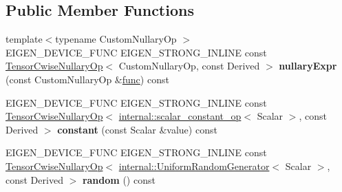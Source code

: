 \subsection*{Public Member Functions}
\begin{DoxyCompactItemize}
\item 
\mbox{\label{class_eigen_1_1_tensor_base_3_01_derived_00_01_read_only_accessors_01_4_a0205b14457f9eb4575b3f0562fc80ca5}} 
{\footnotesize template$<$typename Custom\+Nullary\+Op $>$ }\\E\+I\+G\+E\+N\+\_\+\+D\+E\+V\+I\+C\+E\+\_\+\+F\+U\+NC E\+I\+G\+E\+N\+\_\+\+S\+T\+R\+O\+N\+G\+\_\+\+I\+N\+L\+I\+NE const \hyperlink{class_eigen_1_1_tensor_cwise_nullary_op}{Tensor\+Cwise\+Nullary\+Op}$<$ Custom\+Nullary\+Op, const Derived $>$ {\bfseries nullary\+Expr} (const Custom\+Nullary\+Op \&\hyperlink{structfunc}{func}) const
\item 
\mbox{\label{class_eigen_1_1_tensor_base_3_01_derived_00_01_read_only_accessors_01_4_ad5507588c96d525fc159cdbaf48a8523}} 
E\+I\+G\+E\+N\+\_\+\+D\+E\+V\+I\+C\+E\+\_\+\+F\+U\+NC E\+I\+G\+E\+N\+\_\+\+S\+T\+R\+O\+N\+G\+\_\+\+I\+N\+L\+I\+NE const \hyperlink{class_eigen_1_1_tensor_cwise_nullary_op}{Tensor\+Cwise\+Nullary\+Op}$<$ \hyperlink{struct_eigen_1_1internal_1_1scalar__constant__op}{internal\+::scalar\+\_\+constant\+\_\+op}$<$ Scalar $>$, const Derived $>$ {\bfseries constant} (const Scalar \&value) const
\item 
\mbox{\label{class_eigen_1_1_tensor_base_3_01_derived_00_01_read_only_accessors_01_4_a243890358686131ca02db2a9cd48b1d6}} 
E\+I\+G\+E\+N\+\_\+\+D\+E\+V\+I\+C\+E\+\_\+\+F\+U\+NC E\+I\+G\+E\+N\+\_\+\+S\+T\+R\+O\+N\+G\+\_\+\+I\+N\+L\+I\+NE const \hyperlink{class_eigen_1_1_tensor_cwise_nullary_op}{Tensor\+Cwise\+Nullary\+Op}$<$ \hyperlink{class_eigen_1_1internal_1_1_uniform_random_generator}{internal\+::\+Uniform\+Random\+Generator}$<$ Scalar $>$, const Derived $>$ {\bfseries random} () const
\item 
\mbox{\label{class_eigen_1_1_tensor_base_3_01_derived_00_01_read_only_accessors_01_4_ae0965096d4c989ca0a6061de9bb08c74}} 

\end{DoxyCompactItemize}
